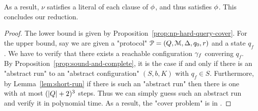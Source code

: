 As a result, $\nu$ satisfies a literal of each clause of $\phi$, and thus satisfies $\phi$. This concludes our reduction.



\thmNPComplete*

\begin{proof}
	The lower bound is given by Proposition~\ref{prop:np-hard-query-cover}.
	For the upper bound, say we are given a "protocol" $\mathcal{P} = (Q, \mathcal{M}, \Delta, q_0, r)$ and a state $q_f$. We have to verify that there exists a reachable configuration $\gamma_f$ convering $q_f$. By Proposition~\ref{prop:sound-and-complete}, it is the case if and only if there is an "abstract run" to an "abstract configuration" $(S,b, K)$ with $q_f \in S$.
	Furthermore, by Lemma~\ref{lem:short-run} if there is such an "abstract run" then there is one with at most $(|Q|+2)^3$ steps. 
	Thus we can simply guess such an abstract run and verify it in polynomial time.
	As a result, the "cover problem" is in \NP. 
\end{proof}